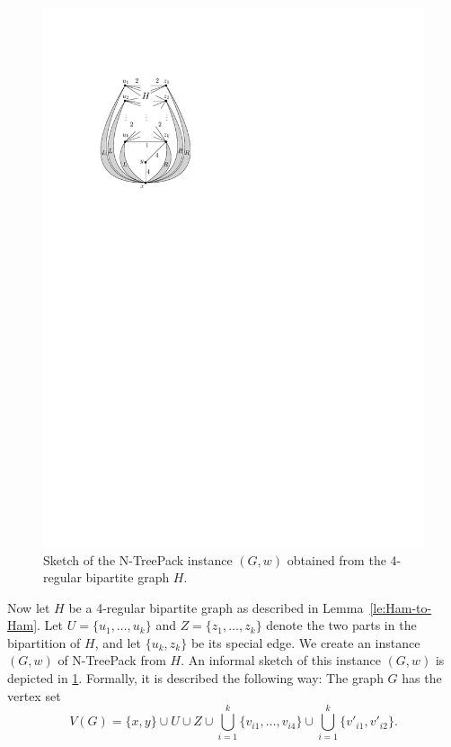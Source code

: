 \documentclass[runningheads]{llncs}
\newcommand{\set}[1]{\{ #1 \}}
\newcommand{\fromto}[2]{\set{#1, \ldots, #2}}
\newcommand{\xxxNTP}{{\sc N-TreePack}}
\begin{document}
\begin{figure}[htpb]
\centering
 \includegraphics[scale=1.1]{img/act-hamilton-cycle-a}
\caption{Sketch of the {\xxxNTP} instance $(G, w)$ obtained from the 4-regular bipartite graph $H$.}
\label{fig:reduction-overview}
\end{figure}
Now let $H$ be a 4-regular bipartite graph as described in Lemma~\ref{le:Ham-to-Ham}.
Let $U=\fromto{u_1}{u_k}$ and $Z=\fromto{z_1}{z_k}$ denote the two parts in the bipartition of $H$, 
and let $\{u_k,z_k\}$ be its special edge.
We create an instance $(G,w)$ of {\xxxNTP} from $H$. An informal sketch of this instance $(G,w)$ is depicted in \cref{fig:reduction-overview}. Formally, it is described the following way:
The graph $G$ has the vertex set 
\[ 
V(G) =  \set{x, y} \cup U \cup Z 
        \cup \bigcup_{i=1}^k \fromto{v_{i1}}{v_{i4}} \cup \bigcup_{i=1}^k \set{v'_{i1}, v'_{i2}}.
\]
\end{document}
